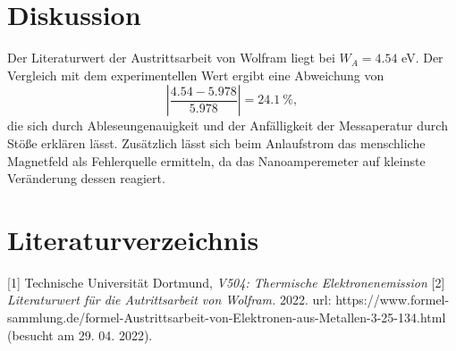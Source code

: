 \section{Diskussion}
Der Literaturwert der Austrittsarbeit von Wolfram liegt bei $W_{A}=4.54$ eV. Der Vergleich mit dem experimentellen Wert ergibt eine Abweichung von
\begin{equation*}
  |\frac{4.54-5.978}{5.978}|=24.1\ \%,
\end{equation*}
die sich durch Ableseungenauigkeit und der Anfälligkeit der Messaperatur durch Stöße erklären lässt. Zusätzlich lässt sich beim Anlaufstrom das menschliche Magnetfeld als Fehlerquelle ermitteln, da das Nanoamperemeter auf kleinste Veränderung dessen reagiert.

\section{Literaturverzeichnis}
[1] Technische Universität Dortmund, \textit{V504: Thermische Elektronenemission}
[2] \textit{Literaturwert für die Autrittsarbeit von Wolfram.} 2022. url: https://www.formel-
sammlung.de/formel-Austrittsarbeit-von-Elektronen-aus-Metallen-3-25-134.html (besucht am 29. 04. 2022).
\newpage
